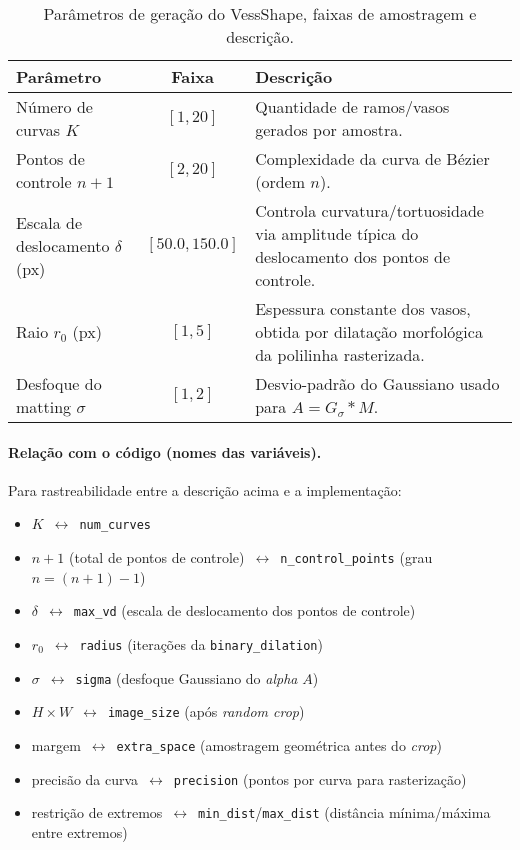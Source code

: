\documentclass[%
reprint,
nofootinbib,
 amsmath,amssymb,
aps,
superscriptaddress,
showkeys,
longbibliography
]{revtex4-1}
\begin{document}
\begin{table*}[t]
\caption{Parâmetros de geração do VessShape, faixas de amostragem e descrição.}
\label{tab:vessshape_params}
\centering
\begin{tabularx}{\textwidth}{l c X}
\hline
	\textbf{Parâmetro} & \textbf{Faixa} & \textbf{Descrição} \\
\hline

Número de curvas $K$ & $[1,20]$ & Quantidade de ramos/vasos gerados por amostra. \\
Pontos de controle $n{+}1$ & $[2,20]$ & Complexidade da curva de Bézier (ordem $n$). \\
Escala de deslocamento $\delta$ (px) & $[50.0,150.0]$ & Controla curvatura/tortuosidade via amplitude típica do deslocamento dos pontos de controle. \\
Raio $r_0$ (px) & $[1,5]$ & Espessura constante dos vasos, obtida por dilatação morfológica da polilinha rasterizada. \\
Desfoque do matting $\sigma$ & $[1,2]$ & Desvio-padrão do Gaussiano usado para $A = G_{\sigma} * M$. \\
\hline
\end{tabularx}
\end{table*}

\paragraph*{Relação com o código (nomes das variáveis).}
Para rastreabilidade entre a descrição acima e a implementação:
\begin{itemize}[leftmargin=*]
  \item $K$ \,$\leftrightarrow$\, \texttt{num\_curves}
  \item $n{+}1$ (total de pontos de controle) \,$\leftrightarrow$\, \texttt{n\_control\_points} (grau $n = (n{+}1)-1$)
  \item $\delta$ \,$\leftrightarrow$\, \texttt{max\_vd} (escala de deslocamento dos pontos de controle)
  \item $r_0$ \,$\leftrightarrow$\, \texttt{radius} (iterações da \texttt{binary\_dilation})
  \item $\sigma$ \,$\leftrightarrow$\, \texttt{sigma} (desfoque Gaussiano do \emph{alpha} $A$)
  \item $H{\times}W$ \,$\leftrightarrow$\, \texttt{image\_size} (após \emph{random crop})
  \item margem \,$\leftrightarrow$\, \texttt{extra\_space} (amostragem geométrica antes do \emph{crop})
  \item precisão da curva \,$\leftrightarrow$\, \texttt{precision} (pontos por curva para rasterização)
  \item restrição de extremos \,$\leftrightarrow$\, \texttt{min\_dist}/\texttt{max\_dist} (distância mínima/máxima entre extremos)
\end{itemize}
\end{document}
